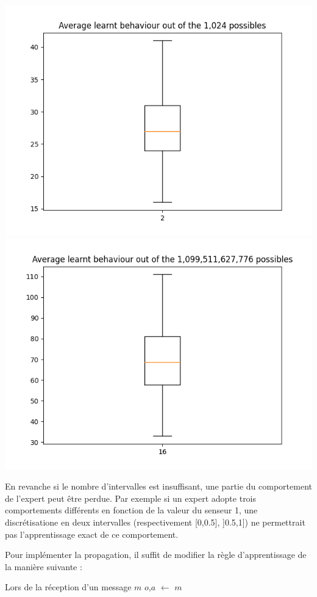 \documentclass[a4paper, 12pt]{report}
\begin{document}
	 
\includegraphics{averageLearntBehaviourD2}
\includegraphics{averageLearntBehaviourD16}
	
	En revanche si le nombre d'intervalles est insuffisant, une partie du comportement de l'expert peut être perdue. Par exemple si un expert adopte trois comportements différents en fonction de la valeur du senseur 1, une discrétisatione en deux intervalles (respectivement [0,0.5], ]0.5,1]) ne permettrait pas l'apprentissage exact de ce comportement.
	
	Pour implémenter la propagation, il suffit de modifier la règle d'apprentissage de la manière suivante :
	
\begin{algorithm}[H]
	Lors de la réception d'un message $m$\;
	$o$,$a$ $\leftarrow$ $m$
\end{algorithm}
	
\end{document}
